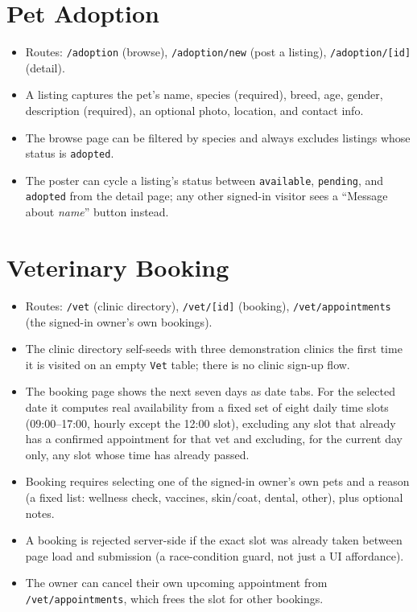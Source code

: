 \documentclass[11pt,a4paper]{article}
\begin{document}
\section{Pet Adoption}
\begin{itemize}[leftmargin=*]
  \item Routes: \texttt{/adoption} (browse), \texttt{/adoption/new} (post a listing),
        \texttt{/adoption/[id]} (detail).
  \item A listing captures the pet's name, species (required), breed, age, gender,
        description (required), an optional photo, location, and contact info.
  \item The browse page can be filtered by species and always excludes listings whose
        status is \texttt{adopted}.
  \item The poster can cycle a listing's status between \texttt{available},
        \texttt{pending}, and \texttt{adopted} from the detail page; any other
        signed-in visitor sees a ``Message about \emph{name}'' button instead.
\end{itemize}

\section{Veterinary Booking}
\begin{itemize}[leftmargin=*]
  \item Routes: \texttt{/vet} (clinic directory), \texttt{/vet/[id]} (booking),
        \texttt{/vet/appointments} (the signed-in owner's own bookings).
  \item The clinic directory self-seeds with three demonstration clinics the first time
        it is visited on an empty \texttt{Vet} table; there is no clinic sign-up flow.
  \item The booking page shows the next seven days as date tabs. For the selected date
        it computes real availability from a fixed set of eight daily time slots
        (09:00--17:00, hourly except the 12:00 slot), excluding any slot that already
        has a confirmed appointment for that vet and excluding, for the current day
        only, any slot whose time has already passed.
  \item Booking requires selecting one of the signed-in owner's own pets and a reason
        (a fixed list: wellness check, vaccines, skin/coat, dental, other), plus
        optional notes.
  \item A booking is rejected server-side if the exact slot was already taken between
        page load and submission (a race-condition guard, not just a UI affordance).
  \item The owner can cancel their own upcoming appointment from
        \texttt{/vet/appointments}, which frees the slot for other bookings.
\end{itemize}
\end{document}

